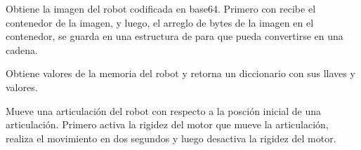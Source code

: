 \begin{fulllineitems}
\label{\detokenize{nao_firebase:nao_robot.Robot.get_image_from_robot}}
Obtiene la imagen del robot codificada en base64. Primero con
 recibe el contenedor de la imagen, y luego,
el arreglo de bytes de la imagen en el contenedor, se guarda en una
estructura de  para que pueda convertirse en una cadena.

\end{fulllineitems}


\begin{fulllineitems}
\label{\detokenize{nao_firebase:nao_robot.Robot.get_values_from_memory}}
Obtiene valores de la memoria del robot y retorna un diccionario
con sus llaves y valores.

\end{fulllineitems}


\begin{fulllineitems}
\label{\detokenize{nao_firebase:nao_robot.Robot.move_joint}}
Mueve una articulación del robot con respecto a la posción inicial de una
articulación. Primero activa la rigidez del motor que mueve la articulación, realiza el movimiento en dos
segundos y luego desactiva la rigidez del motor.

\end{fulllineitems}


